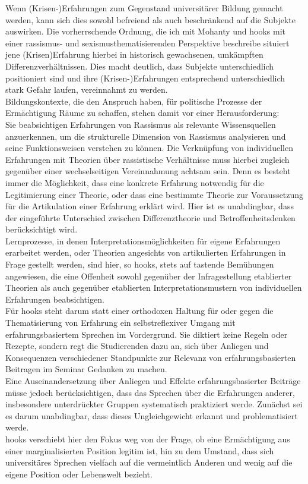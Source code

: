 \noindent Wenn (Krisen-)Erfahrungen zum Gegenstand universitärer Bildung gemacht werden,
kann sich dies sowohl befreiend als auch beschränkend auf die Subjekte
auswirken. Die vorherrschende Ordnung, die ich mit Mohanty und hooks mit einer
rassismus- und sexismusthematisierenden Perspektive beschreibe situiert jene
(Krisen)Erfahrung hierbei in historisch gewachsenen, umkämpften
Differenzverhältnissen. Dies macht deutlich, dass Subjekte unterschiedlich
positioniert sind und ihre (Krisen-)Erfahrungen entsprechend unterschiedlich
stark Gefahr laufen, vereinnahmt zu werden. \\
Bildungskontexte, die den Anspruch
haben, für politische Prozesse der Ermächtigung Räume zu schaffen, stehen damit
vor einer Herausforderung:\\
Sie beabsichtigen Erfahrungen von Rassismus als
relevante Wissensquellen anzuerkennen, um die strukturelle Dimension von
Rassismus analysieren und seine Funktionsweisen verstehen zu können. Die
Verknüpfung von individuellen Erfahrungen mit Theorien über rassistische
Verhältnisse muss hierbei zugleich gegenüber einer wechselseitigen
Vereinnahmung achtsam sein. Denn es besteht immer die Möglichkeit, dass eine
konkrete Erfahrung notwendig für die Legitimierung einer Theorie, oder dass
eine bestimmte Theorie zur Voraussetzung für die Artikulation einer Erfahrung
erklärt wird. Hier ist es unabdingbar, dass der eingeführte Unterschied
zwischen Differenztheorie und Betroffenheitsdenken berücksichtigt wird.\\
Lernprozesse, in denen Interpretationsmöglichkeiten für eigene Erfahrungen
erarbeitet werden, oder Theorien angesichts von artikulierten Erfahrungen in
Frage gestellt werden, sind hier, so hooks,  stets auf tastende Bemühungen
angewiesen, die eine Offenheit sowohl gegenüber der Infragestellung etablierter
Theorien als auch gegenüber etablierten Interpretationsmustern von
individuellen Erfahrungen beabsichtigen.\footnotemark{}\\

Für hooks steht darum statt einer orthodoxen Haltung für oder gegen die
Thematisierung von Erfahrung ein selbstreflexiver Umgang mit
erfahrungsbasiertem Sprechen im Vordergrund. Sie diktiert keine Regeln oder
Rezepte, sondern regt die Studierenden dazu an, sich über Anliegen und
Konsequenzen verschiedener Standpunkte zur Relevanz von erfahrungsbasierten
Beitragen im Seminar Gedanken zu machen.\\
Eine Auseinandersetzung über Anliegen
und Effekte erfahrungsbasierter Beiträge müsse jedoch berücksichtigen, dass das
Sprechen über die Erfahrungen anderer, insbesondere unterdrückter Gruppen
systematisch praktiziert werde. Zunächst sei es darum unabdingbar, dass dieses
Ungleichgewicht erkannt und problematisiert werde.\footnotemark{}\\
 hooks verschiebt hier den
Fokus weg von der Frage, ob eine Ermächtigung aus einer marginalisierten
Position legitim ist, hin zu dem Umstand, dass sich universitäres Sprechen
vielfach auf die vermeintlich Anderen und wenig auf die eigene Position oder
Lebenswelt bezieht. 

